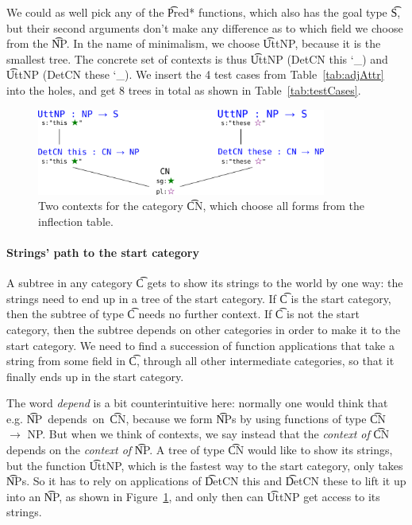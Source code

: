 We could as well pick any of the \t{Pred*} functions, which also has the goal
type \t{S}, but their second arguments don't make any difference as to
which field we choose from the \t{NP}. In the name of minimalism, we
choose \t{UttNP}, because it is the smallest tree. The concrete set of
contexts is thus \t{UttNP (DetCN this \char`_)} and \t{UttNP (DetCN
  these \char`_)}.  We insert the 4 test cases from
Table~\ref{tab:adjAttr} into the holes, and get 8 trees in total as
shown in Table~\ref{tab:testCases}.

\begin{figure}[t]
\centering
\includegraphics[width=0.85\textwidth]{img/context-example.png}
\caption{Two contexts for the category \t{CN}, which choose all forms from the inflection table.}
\label{fig:context-general}
\end{figure}



\paragraph{Strings' path to the start category}
A subtree in any category \t{C} gets to show its strings to the world
by one way: the strings need to end up in a tree of the start
category.  If \t{C} is the start category, then the subtree of type
\t{C} needs no further context. If \t{C} is not the start category,
then the subtree depends on other categories in order to make it to
the start category. We need to find a succession of function
applications that take a string from some field in \t{C}, through all
other intermediate categories, so that it finally ends up in the start
category.

The word \emph{depend} is a bit counterintuitive here: normally one
would think that e.g. \t{NP}~depends~on~\t{CN}, because we form
\t{NP}s by using functions of type \t{CN $\rightarrow$ NP}. But when
we think of contexts, we say instead that the \emph{context of} \t{CN}
depends on the \emph{context of} \t{NP}. A tree of type \t{CN} would
like to show its strings, but the function \t{UttNP}, which is the
fastest way to the start category, only takes \t{NP}s. So it has to
rely on applications of \t{DetCN this} and \t{DetCN these} to lift it
up into an \t{NP}, as shown in Figure~\ref{fig:context-general}, and
only then can \t{UttNP} get access to its strings.

